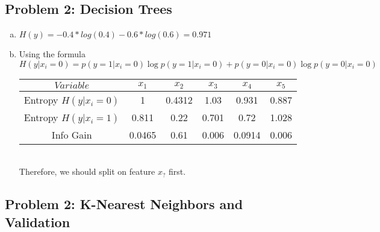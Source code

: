 \documentclass[twoside,11pt]{article}
\theoremstyle{definition}
\begin{document}

\subsection*{Problem 2: Decision Trees}

\begin{enumerate}[(a)]

\item $H(y) = - 0.4 * log(0.4) - 0.6*log(0.6) = 0.971$

\item Using the formula $H(y|x_i = 0) = p(y=1 | x_i = 0) \log p(y=1 | x_i = 0) + p(y=0 | x_i = 0) \log p(y=0 | x_i = 0)$
\begin{tabular}{|c|c|c|c|c|c|}\hline
$Variable$ & $x_1$ & $x_2$ & $x_3$ & $x_4$ & $x_5$ \\
\hline
Entropy $H(y|x_i = 0)$ & 1 & 0.4312 & 1.03 & 0.931 & 0.887 \\
\hline
Entropy $H(y|x_i = 1)$ & 0.811 & 0.22 & 0.701 & 0.72 & 1.028 \\
\hline
Info Gain & 0.0465 & 0.61 & 0.006 & 0.0914 & 0.006 \\
\hline
\end{tabular}
\\ Therefore, we should split on feature $x_?$ first.

\end{enumerate}


\subsection*{Problem 2: K-Nearest Neighbors and Validation}
\end{document}
